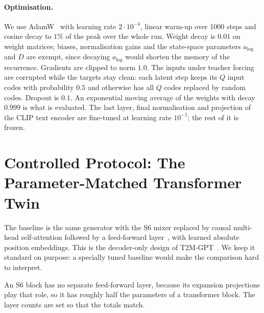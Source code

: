 \paragraph{Optimisation.} We use AdamW~\cite{loshchilov2019adamw} with learning rate $2 \cdot 10^{-4}$, linear warm-up over 1000 steps and cosine decay to $1\%$ of the peak over the whole run. Weight decay is $0.01$ on weight matrices; biases, normalisation gains and the state-space parameters $a_{\log}$ and $D$ are exempt, since decaying $a_{\log}$ would shorten the memory of the recurrence. Gradients are clipped to norm $1.0$. The inputs under teacher forcing are corrupted while the targets stay clean: each latent step keeps its $Q$ input codes with probability $0.5$ and otherwise has all $Q$ codes replaced by random codes. Dropout is $0.1$. An exponential moving average of the weights with decay $0.999$ is what is evaluated. The last layer, final normalisation and projection of the CLIP text encoder are fine-tuned at learning rate $10^{-5}$; the rest of it is frozen.

\section{Controlled Protocol: The Parameter-Matched Transformer Twin}
\label{sec:gen_twin}

The baseline is the same generator with the S6 mixer replaced by causal multi-head self-attention followed by a feed-forward layer~\cite{vaswani2017attention}, with learned absolute position embeddings. This is the decoder-only design of T2M-GPT~\cite{zhang2023t2mgpt}. We keep it standard on purpose: a specially tuned baseline would make the comparison hard to interpret.

An S6 block has no separate feed-forward layer, because its expansion projections play that role, so it has roughly half the parameters of a transformer block. The layer counts are set so that the totals match.

